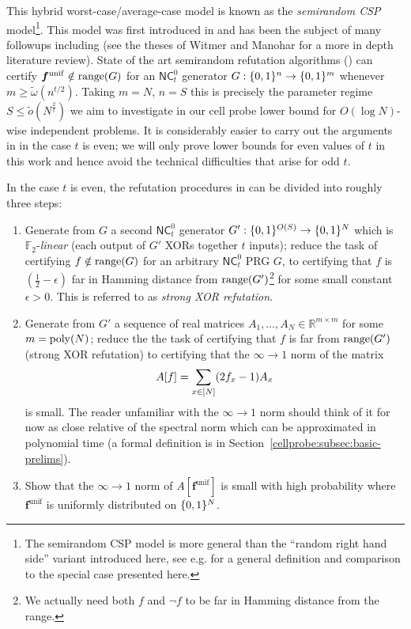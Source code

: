 This hybrid worst-case/average-case model is known as the \emph{semirandom CSP} model\footnote{The semirandom CSP model is more general than the ``random right hand side'' variant introduced here, see e.g. \cite{semirandom} for a general definition and comparison to the special case presented here.}. This model was first introduced in \cite{feige-semirandom} and has been the subject of many followups including \cite{feige-semirandom,aow,semirandom,smoothed} (see the theses of Witmer and Manohar \cite{witmer-thesis,manohar-thesis} for a more in depth literature review).
State of the art semirandom refutation algorithms (\cite{semirandom,smoothed,simpler-moore}) can certify $\bm{f}^{\mathrm{unif}} \notin \mathrm{range}(G)$ for an $\mathsf{NC}^0_t$ generator $G: \{0,1\}^n \to \{0,1\}^m$ whenever $m \geq \tilde{\omega}(n^{t/2})$. Taking $m = N$, $n = S$ this is precisely the parameter regime $S \leq \tilde{o}(N^{\frac{2}{t}})$ we aim to investigate in our cell probe lower bound for $O(\log N)$-wise independent problems. 
It is considerably easier to carry out the arguments in \cite{semirandom,smoothed,simpler-moore} in the case $t$ is even; we will only prove lower bounds for even values of $t$ in this work and hence avoid the technical difficulties that arise for odd $t$. 

In the case $t$ is even, the refutation procedures in \cite{semirandom,smoothed,simpler-moore} can be divided into roughly three steps:
\begin{enumerate}
    \item Generate from $G$ a second $\mathsf{NC}^0_t$ generator $G':\{0,1\}^{O(S)} \to \{0,1\}^N$ which is $\mathbb{F}_2$-\emph{linear} (each output of $G'$ XORs together $t$ inputs); reduce the task of certifying $f \notin \mathrm{range}(G)$ for an arbitrary $\mathsf{NC}^0_t$ PRG $G$, to certifying that $f$ is $(\frac{1}{2}-\epsilon)$ far in Hamming distance from $\mathrm{range}(G')$\footnote{We actually need both $f$ and $\lnot f$ to be far in Hamming distance from the range.} for some small constant $\epsilon >0$. This is referred to as \emph{strong XOR refutation}.
    \item Generate from $G'$ a sequence of real matrices $A_1,\ldots,A_N \in \mathbb{R}^{m\times m}$ for some $m = \mathrm{poly}(N)$; reduce the the task of certifying that $f$ is far from $\mathrm{range}(G')$ (strong XOR refutation) to certifying that the $\infty\to1$ norm of the matrix
    \[
    A[f] = \sum_{x \in [N]} (2f_x-1) A_x
    \]
    is small. The reader unfamiliar with the $\infty\to1$ norm should think of it for now as close relative of the spectral norm which can be approximated in polynomial time (a formal definition is in Section~\ref{cellprobe:subsec:basic-prelims}).
    \item Show that the $\infty\to 1$ norm of $A[\bm{f}^{\mathrm{unif}}]$ is small with high probability where $\bm{f}^{\mathrm{unif}}$ is uniformly distributed on $\{0,1\}^N$.
\end{enumerate}

